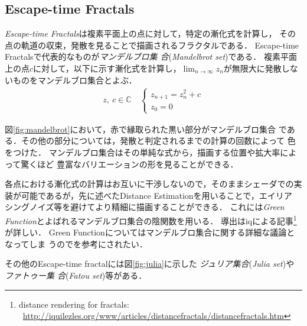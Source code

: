 \subsection{Escape-time Fractals}

\textit{Escape-time Fractals}は複素平面上の点に対して，特定の漸化式を計算し，
その点の軌道の収束，発散を見ることで描画されるフラクタルである．
Escape-time Fractalsで代表的なものが\emph{マンデルブロ集
合}(\textit{Mandelbrot set})である．
複素平面上の点$c$に対して，以下に示す漸化式を計算し，$\displaystyle \lim_{n
\to \infty} z_n$が無限大に発散しないものをマンデルブロ集合とよぶ．
\begin{align*}
 z,~c \in \mathbb{C} \quad
 \begin{cases}
  z_{n+1} = z^2_{n} + c \\ z_0 = 0
 \end{cases}
\end{align*}

図\ref{fig:mandelbrot}において，赤で縁取られた黒い部分がマンデルブロ集合
である．その他の部分については，発散と判定されるまでの計算の回数によって
色をつけた．
マンデルブロ集合はその単純な式から，描画する位置や拡大率によって驚くほど
豊富なバリエーションの形を見ることができる．

各点における漸化式の計算はお互いに干渉しないので，そのままシェーダでの実
装が可能であるが，先に述べたDistance Estimationを用いることで，エイリア
シングノイズ等を避けてより精細に描画することができる．
これには\textit{Green Function}とよばれるマンデルブロ集合の陰関数を用いる．
導出はiqによる記事\footnote{distance rendering for fractals:
~\url{http://iquilezles.org/www/articles/distancefractals/distancefractals.htm}}
が詳しい．
Green Functionについてはマンデルブロ集合に関する詳細な議論となってしま
うので\cite{douady1984exploring}を参考にされたい．

その他のEscape-time fractalには図\ref{fig:julia}に示した
\emph{ジュリア集合}(\textit{Julia set})や\emph{ファトゥー集
合}(\textit{Fatou set})等がある．

